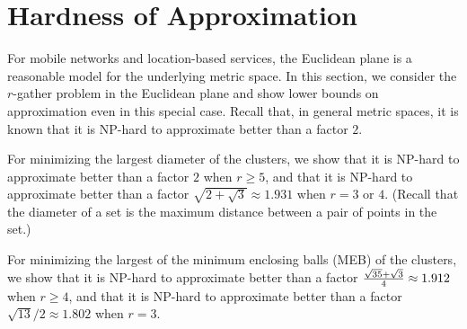 
\section{Hardness of Approximation}

For mobile networks and location-based services, the Euclidean plane is a reasonable model for the underlying metric space. In this section, we consider the $r$-gather problem in the Euclidean plane and show lower bounds on approximation even in this special case.  Recall that, in general metric spaces, it is known that it is NP-hard to approximate better than a factor $2$. 

For minimizing the largest diameter of the clusters, we show that it is NP-hard to approximate better than a factor $2$ when $r\geq5$, and that it is NP-hard to approximate better than a factor $\sqrt{2+\sqrt{3}} \approx 1.931$ when $r=3$ or $4$.  (Recall that the diameter of a set is the maximum distance between a pair of points in the set.)

For minimizing the largest of the minimum enclosing balls (MEB) of the clusters, we show that it is NP-hard to approximate better than a factor ${\sqrt{35}+\sqrt{3} \over 4} \approx 1.912$ when $r \geq 4$, and that it is NP-hard to approximate better than a factor $\sqrt{13}/2 \approx 1.802$ when $r=3$.



